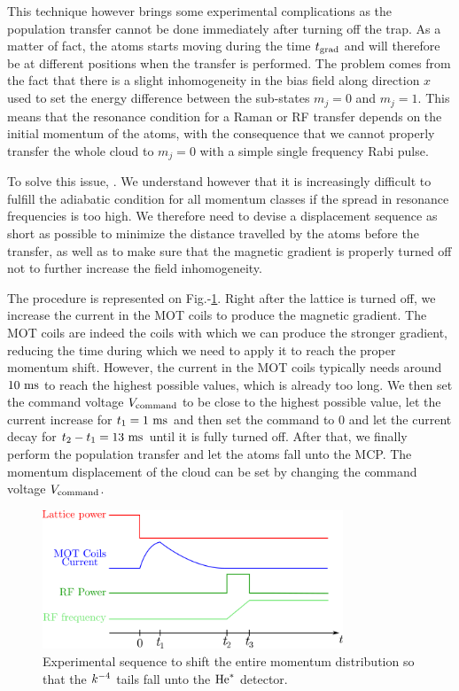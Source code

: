 This technique however brings some experimental complications as the population transfer cannot be done immediately after turning off the trap. As a matter of fact, the atoms starts moving during the time $t_{\rm{grad}}$ and will therefore be at different positions when the transfer is performed. The problem comes from the fact that there is a slight inhomogeneity in the bias field along direction $x$ used to set the energy difference between the sub-states $m_j=0$ and $m_j=1$. This means that the resonance condition for a Raman or RF transfer depends on the initial momentum of the atoms, with the consequence that we cannot properly transfer the whole cloud to $m_j=0$ with a simple single frequency Rabi pulse.

To solve this issue, . We understand however that it is increasingly difficult to fulfill the adiabatic condition for all momentum classes if the spread in resonance frequencies is too high. We therefore need to devise a displacement sequence as short as possible to minimize the distance travelled by the atoms before the transfer, as well as to make sure that the magnetic gradient is properly turned off not to further increase the field inhomogeneity.

The procedure is represented on Fig.-\ref{fig:displacement_sequence}. Right after the lattice is turned off, we increase the current in the MOT coils to produce the magnetic gradient. The MOT coils are indeed the coils with which we can produce the stronger gradient, reducing the time during which we need to apply it to reach the proper momentum shift. However, the current in the MOT coils typically needs around $10 \ \rm{ms}$ to reach the highest possible values, which is already too long. We then set the command voltage $V_{\rm{command}}$ to be close to the highest possible value, let the current increase for $t_1 = 1 \ \rm{ms}$ and then set the command to $0$ and let the current decay for $t_2-t_1=13 \ \rm{ms}$  until it is fully turned off. After that, we finally perform the population transfer and let the atoms fall unto the MCP. The momentum displacement of the cloud can be set by changing the command voltage $V_{\rm{command}}$.

\begin{figure}
    \centering
    \includegraphics[width=0.8\textwidth]{Fig/Chapter5/displacement_sequence.png}
    \caption{Experimental sequence to shift the entire momentum distribution so that the $k^{-4}$ tails fall unto the $\mathrm{He}^*$ detector.}
    \label{fig:displacement_sequence}
\end{figure}

